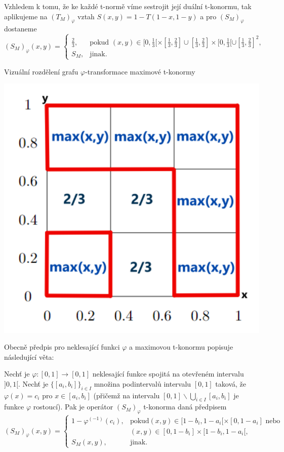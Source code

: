 Vzhledem k tomu, \v ze ke ka\v zd\'e t-norm\v e v\'ime sestrojit jej\'i du\'aln\'i t-konormu, tak aplikujeme na $\left(T_M\right)_\varphi$ vztah $S(x,y)=1-T(1-x,1-y)$ a pro $\left(S_M\right)_\varphi$ dostaneme
 $$(S_M)_\varphi(x,y) = \begin{cases} \frac{2}{3}, & \mbox {pokud } (x,y) \in [0,\frac{1}{3}[\times[\frac{1}{3},\frac{2}{3}] \cup [\frac{1}{3},\frac{2}{3}]\times[0,\frac{1}{3}[ \cup [\frac{1}{3},\frac{2}{3}]^2,
    \\ S_M, & \mbox {jinak. }
    \end{cases}$$
    \begin{graph}Vizu\' aln\' i rozd\v elen\'i grafu $\varphi$-transformace maximové t-konormy
    \label{graph: max-conorm}

\centering
\includegraphics[scale=0.8]{template-fig/phi-t-conorm.pdf}
\end{graph}

Obecn\v e p\v redpis  pro neklesaj\'ic\'i funkci $\varphi$ a maximovou t-konormu popisuje n\'asleduj\'ic\'i v\v eta:
\begin{sentence}
\label{t-conorm}
 Nech\v t je $\varphi:[0,1]\rightarrow [0,1]$
neklesající funkce spojitá na otevřeném intervalu $]0,1[$.
Nech\v t je $\{[a_i,b_i]\}_{i\in I}$ množina podinterval\r u
intervalu $[0,1]$ taková, že $\varphi(x)=c_i$ pro $x\in
[a_i,b_i]$ (přičemž na intervalu $[0,1]\backslash \bigcup \limits_{i \in I}
[a_i,b_i]$ je funkce $\varphi$
rostoucí).
Pak je operátor $(S_M)_{\varphi}$  t-konorma daná předpisem
$$ (S_M)_{\varphi}(x,y) = \begin{cases} 1-\varphi^{(-1)}(c_i), &\mbox {pokud
$(x,y)\in [1-b_i,1-a_i[\times[0,1-a_i]$ nebo}
\\ & (x,y)\in [0,1-b_i]\times[1-b_i,1-a_i[,
\\ S_M(x,y), &\mbox {jinak.}
\end{cases} $$
\end{sentence}
    
